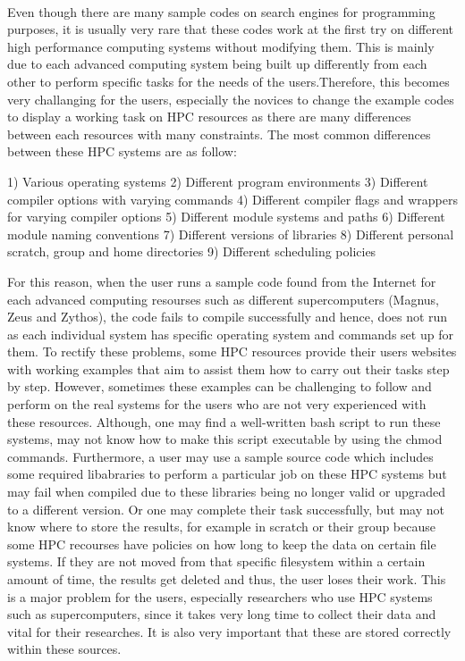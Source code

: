 \begin{Document}
{\begin{abstract}
\end{abstract}
\\
\begin{Introduction}

Even though there are many sample codes on search engines for programming purposes, it is usually very rare that these codes work at the first try 
on different high performance computing systems without modifying them. This is mainly due to each advanced computing system being built up differently
from each other to perform specific tasks for the needs of the users.Therefore, this  becomes very challanging for the users, especially the novices to
change the example codes to display a working task on HPC resources as there are many differences between each resources with many constraints. The most
common differences between these HPC systems are as follow:

1) Various operating systems 
2) Different program environments
3) Different compiler options with varying commands
4) Different compiler flags and wrappers for varying compiler options
5) Different module systems and paths
6) Different module naming conventions
7) Different versions of libraries
8) Different personal scratch, group and home directories
9) Different scheduling policies

For this reason, when the user runs a sample code found from the Internet for each advanced computing resourses such as different supercomputers (Magnus,
Zeus and Zythos), the code fails to compile successfully and hence, does not run as each individual system has specific operating system and 
commands set up for them. To rectify these problems, some HPC resources provide their users websites with working examples that aim to assist them how to
carry out their tasks step by step. However, sometimes these examples can be challenging to follow and perform on the real systems for the users who are 
not very experienced with these resources. Although, one may find a well-written bash script to run these systems, may not know how to make this script
executable by using the chmod commands. Furthermore, a user may use a sample source code which includes some required libabraries to perform a particular
job on these HPC systems but may fail when compiled due to these libraries being no longer valid or upgraded to a different version. Or one may complete 
their task successfully, but may not know where to store the results, for example in scratch or their group because some HPC recourses have policies on 
how long to keep the data on certain file systems. If they are not moved from that specific filesystem within a certain amount of time, the results get
deleted and thus, the user loses their work. This is a major problem for the users, especially researchers who use HPC systems such as supercomputers,
since it takes very long time to collect their data and vital for their researches. It is also very important that these are stored correctly within
these sources.


\end{Introduction}}
\end{Document}
